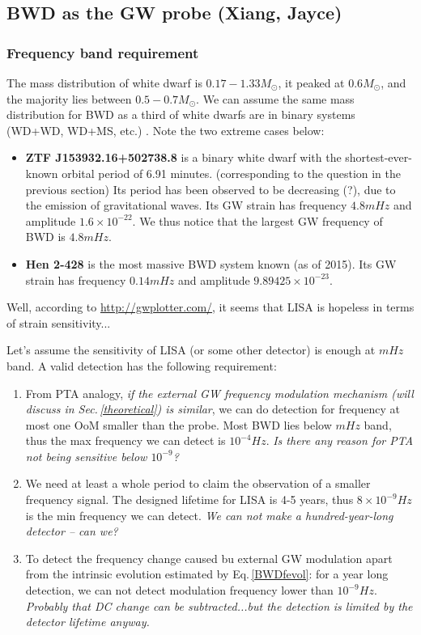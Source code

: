 \documentclass{article}
\begin{document}
\subsection{BWD as the GW probe (Xiang, Jayce)}

\subsubsection{Frequency band requirement}

The mass distribution of white dwarf is $0.17-1.33 M_\odot$, it peaked at $0.6 M_\odot$, and the majority lies between $0.5-0.7 M_\odot$\cite{Kepler2007}. We can assume the same mass distribution for BWD as a third of white dwarfs are in binary systems (WD+WD, WD+MS, etc.) \cite{Holberg2009}. Note the two extreme cases below: 

\begin{itemize}
    \item \textbf{ZTF J153932.16+502738.8} is a binary white dwarf with the shortest-ever-known orbital period of 6.91 minutes. (corresponding to the question in the previous section) Its period has been observed to be decreasing (?), due to the emission of gravitational waves. Its GW strain has frequency $4.8 mHz$ and amplitude $1.6 \times 10^{-22}$. We thus notice that the largest GW frequency of BWD is $4.8 mHz$.
    \item \textbf{Hen 2-428} is the most massive BWD system known (as of 2015). Its GW strain has frequency $0.14 mHz$ and amplitude $9.89425\times10^{-23}$.
\end{itemize}

Well, according to \url{http://gwplotter.com/}, it seems that LISA is hopeless in terms of strain sensitivity...

Let's assume the sensitivity of LISA (or some other detector) is enough at $mHz$ band. A valid detection has the following requirement:
\begin{enumerate}
    \item From PTA analogy\cite{Hobbs2010,Moore2015}, \emph{if the external GW frequency modulation mechanism (will discuss in Sec.\,\ref{theoretical}) is similar}, we can do detection for frequency at most one OoM smaller than the probe. Most BWD lies below $mHz$ band, thus the max frequency we can detect is $10^{-4} Hz$. \emph{Is there any reason for PTA not being sensitive below $10^{-9}$?}
    \item We need at least a whole period to claim the observation of a smaller frequency signal. The designed lifetime for LISA is 4-5 years\cite{Lamberts2019}, thus $8\times10^{-9} Hz$ is the min frequency we can detect. \emph{We can not make a hundred-year-long detector -- can we?}
    \item To detect the frequency change caused bu external GW modulation apart from the intrinsic evolution estimated by Eq.\,\eqref{BWDfevol}: for a year long detection, we can not detect modulation frequency lower than $10^{-9}Hz$. \emph{Probably that DC change can be subtracted...but the detection is limited by the detector lifetime anyway.}
\end{enumerate}
\end{document}
